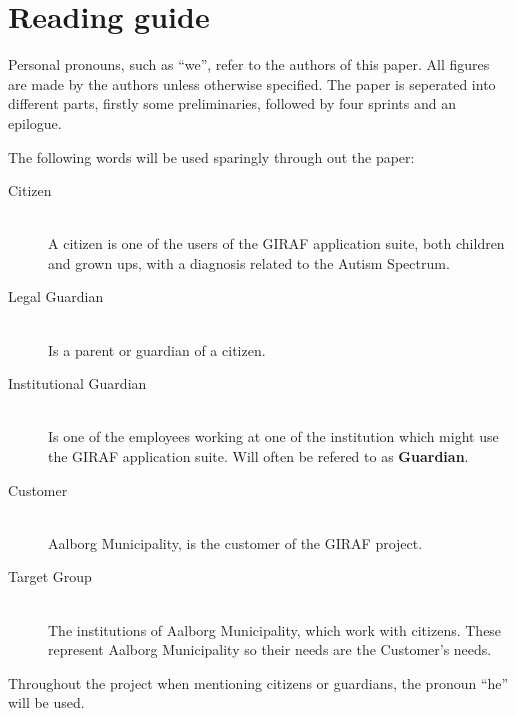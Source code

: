 \section*{Reading guide}
Personal pronouns, such as \enquote{we}, refer to the authors of this paper. 
All figures are made by the authors unless otherwise specified.
The paper is seperated into different parts, firstly some preliminaries, followed by four sprints and an epilogue.


The following words will be used sparingly through out the paper:
\begin{description}
    \item[Citizen] \hfill\\
        A citizen is one of the users of the GIRAF application suite, both children and grown ups, with a diagnosis related to the Autism Spectrum.
	\item[Legal Guardian] \hfill\\
        Is a parent or guardian of a citizen.
    \item[Institutional Guardian] \hfill\\
        Is one of the employees working at one of the institution which might use the GIRAF application suite. Will often be refered to as \textbf{Guardian}.
	\item[Customer] \hfill\\
        Aalborg Municipality, is the customer of the GIRAF project.
	\item[Target Group] \hfill\\
        The institutions of Aalborg Municipality, which work with citizens. These represent Aalborg Municipality so their needs are the Customer's needs.
\end{description}
Throughout the project when mentioning citizens or guardians, the pronoun \enquote{he} will be used.
